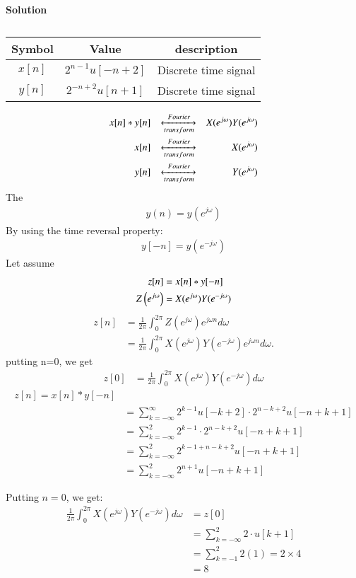 \documentclass[journal,12pt,twocolumn]{IEEEtran}
\theoremstyle{remark}
\begin{document}
\textbf{Solution}\\
\begin{table}[!h]
\begin{center}
\renewcommand\thetable{1}
\begin{tabular}{ |c|c|c| } 
  \hline
    Symbol & Value & description \\ 
  \hline
  $x[n] $ & $2^{n-1}u[-n+2]$ & Discrete time signal  \\ 
  \hline
  $y[n] $ & $2^{-n+2}u[n+1]$ & Discrete time signal  \\ 
  \hline
\end{tabular}
\end{center}
\caption{}
\end{table}
\begin{align}
     x[n]*y[n] && \xleftrightarrow[transform]{Fourier} && X(e^{j\omega}) Y(e^{j\omega})\\
 x[n] && \xleftrightarrow [transform]{Fourier} && X(e^{j\omega}) \\
 y[n] && \xleftrightarrow [transform]{Fourier} && Y(e^{j\omega}) 
\end{align}
The
 \begin{align}
       y(n) = y(e^{j\omega})
\end{align}
By using the time reversal property:
\begin{align}
y[-n] = y(e^{-j\omega})
\end{align}
Let assume
\begin{align}
     z[n]& = x[n] * y[-n]\\
     Z\left(e^{j \omega}\right) &=X(e^{j\omega}) Y(e^{-j\omega})
 \end{align}
\begin{align}
      z[n]& =\frac{1}{2\pi} \int_{0}^{2\pi} Z(e^{j\omega})e^{j \omega n} d\omega \\
      &=\frac{1}{2\pi} \int_{0}^{2\pi}  X(e^{j\omega}) Y(e^{-j\omega})e^{j \omega n} d\omega.
 \end{align}
 putting  n=0, we get
\begin{align}
    z[0]&=\frac{1}{2\pi} \int_{0}^{2\pi} X(e^{j\omega}) Y(e^{-j\omega}) d\omega
\end{align}
\begin{align}
    z[n] = x[n] * y[-n]\\
 &= \sum_{k=-\infty}^{\infty} 2^{k-1} u[-k+2]\cdot 2^{n-k+2} u[-n+k+1]\\
 &= \sum_{k=-\infty}^{2} 2^{k-1} \cdot 2^{n-k+2} u[-n+k+1]\\
 &= \sum_{k=-\infty}^{2} 2^{k-1+n-k+2} u[-n+k+1]\\
 &= \sum_{k=-\infty}^{2} 2^{n+1} u[-n+k+1]
\end{align}

Putting $n = 0$, we get:
\begin{align}
     \frac{1}{2\pi} \int_{0}^{2\pi} X(e^{j\omega}) Y(e^{-j\omega}) d\omega &= z[0]\\
     &= \sum_{k=-\infty}^{2} 2 \cdot u[k+1] \\
     &=\sum_{k=-1}^{2} 2(1) = 2 \times 4 \\
     &= 8
\end{align}
\end{document}
